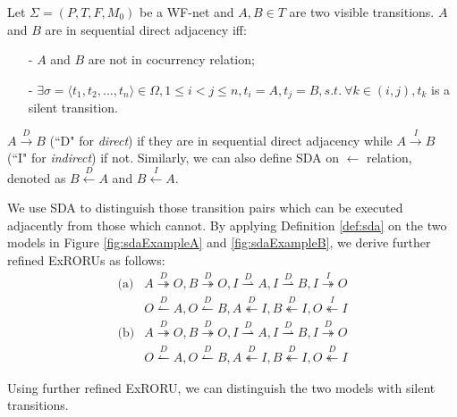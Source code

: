 \documentclass[dvips,...]{llncs}
\begin{document}
\begin{definition}\label{def:sda}
Let $\Sigma=(P,T,F,M_{0})$ be a WF-net and $A,B\in T$ are two visible transitions. $A$ and $B$ are in sequential direct adjacency iff:
	\begin{itemize}
		\item[-] $A$ and $B$ are not in cocurrency relation;
		\item[-] $\exists\sigma=\langle t_{1},t_{2},...,t_{n}\rangle\in\Omega,1\leq i<j\leq n,t_{i}=A,t_{j}=B,s.t.~\forall k\in(i,j),t_{k}$ is a silent transition.
	\end{itemize}
$A\overset{D}{\rightarrow}B$ (``D" for \textit{direct}) if they are in sequential direct adjacency while $A\overset{I}{\rightarrow}B$ (``I" for \textit{indirect}) if not. Similarly, we can also define SDA on $\leftarrow$ relation, denoted as $B\overset{D}{\leftarrow}A$ and $B\overset{I}{\leftarrow}A$.
\end{definition}

We use SDA to distinguish those transition pairs which can be executed adjacently from those which cannot. By applying Definition \ref{def:sda} on the two models in Figure \ref{fig:sdaExampleA} and \ref{fig:sdaExampleB}, we derive further refined ExRORUs as follows:
\begin{displaymath}
	\begin{aligned}
		\text{(a)} & A\overset{D}{\twoheadrightarrow}O, B\overset{D}{\twoheadrightarrow}O, I\overset{D}{\rightharpoonup}A, I\overset{D}{\rightharpoonup}B, I\overset{I}{\twoheadrightarrow}O\\
		& O\overset{D}{\leftharpoonup}A, O\overset{D}{\leftharpoonup}B, A\overset{D}{\twoheadleftarrow}I, B\overset{D}{\twoheadleftarrow}I, O\overset{I}{\twoheadleftarrow}I\\
		\text{(b)} & A\overset{D}{\twoheadrightarrow}O, B\overset{D}{\twoheadrightarrow}O, I\overset{D}{\rightharpoonup}A, I\overset{D}{\rightharpoonup}B, I\overset{D}{\twoheadrightarrow}O\\
		& O\overset{D}{\leftharpoonup}A, O\overset{D}{\leftharpoonup}B, A\overset{D}{\twoheadleftarrow}I, B\overset{D}{\twoheadleftarrow}I, O\overset{D}{\twoheadleftarrow}I
	\end{aligned}
\end{displaymath}

Using further refined ExRORU, we can distinguish the two models with silent transitions.

\end{document}
